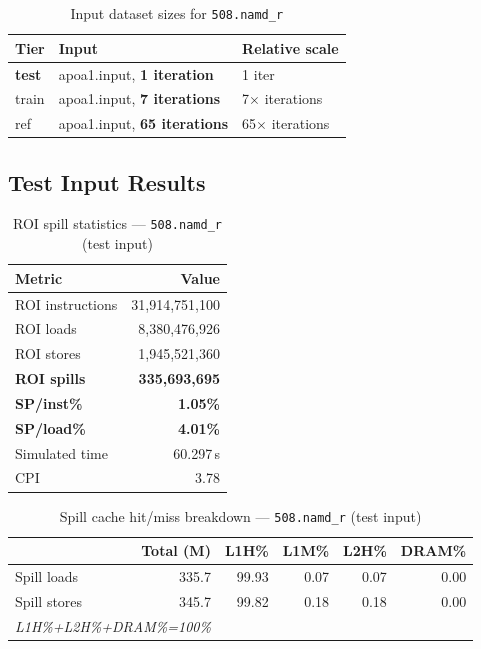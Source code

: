 \documentclass[11pt,a4paper]{article}
\begin{document}
\begin{table}[H]
\centering
\caption{Input dataset sizes for \texttt{508.namd\_r}}
\label{tab:namd_inputs}
\small
\begin{tabular}{lp{8cm}l}
\toprule
\textbf{Tier} & \textbf{Input} & \textbf{Relative scale} \\
\midrule
\textbf{test} & apoa1.input, \textbf{1 iteration} & 1 iter \\
train & apoa1.input, \textbf{7 iterations} & 7$\times$ iterations \\
ref & apoa1.input, \textbf{65 iterations} & 65$\times$ iterations \\
\bottomrule
\end{tabular}
\end{table}

\subsection{Test Input Results}

\begin{table}[H]
\centering
\caption{ROI spill statistics --- \texttt{508.namd\_r} (test input)}
\label{tab:namd_test_roi}
\begin{tabular}{lr}
\toprule
\textbf{Metric} & \textbf{Value} \\
\midrule
ROI instructions & 31,914,751,100 \\
ROI loads        & 8,380,476,926 \\
ROI stores       & 1,945,521,360 \\
\textbf{ROI spills}   & \textbf{335,693,695} \\
\textbf{SP/inst\%}   & \textbf{1.05\%} \\
\textbf{SP/load\%}   & \textbf{4.01\%} \\
Simulated time   & 60.297\,s \\
CPI              & 3.78 \\
\bottomrule
\end{tabular}
\end{table}

\begin{table}[H]
\centering
\caption{Spill cache hit/miss breakdown --- \texttt{508.namd\_r} (test input)}
\label{tab:namd_test_cache}
\begin{tabular}{lrrrrr}
\toprule
\textbf{} & \textbf{Total (M)} & \textbf{L1H\%} & \textbf{L1M\%} & \textbf{L2H\%} & \textbf{DRAM\%} \\
\midrule
Spill loads  & 335.7 & 99.93 & 0.07 & 0.07 & 0.00 \\
Spill stores & 345.7 & 99.82 & 0.18 & 0.18 & 0.00 \\
\multicolumn{2}{l}{\small\textit{L1H\%+L2H\%+DRAM\%=100\%}} \\
\bottomrule
\end{tabular}
\end{table}
\end{document}
